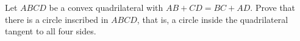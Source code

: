Let $ABCD$ be a convex quadrilateral with $AB+CD=BC+AD$. Prove that there is a circle inscribed in $ABCD$, that is, a circle inside the quadrilateral tangent to all four sides.
